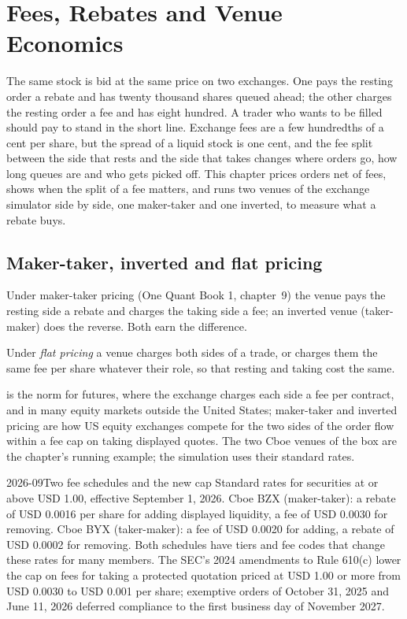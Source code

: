 \chapter{Fees, Rebates and Venue Economics}\label{ch:mx:fees-rebates-and-venue-economics}

The same stock is bid at the same price on two exchanges. One pays the resting order a rebate and has twenty thousand shares queued ahead; the other
charges the resting order a fee and has eight hundred. A trader who wants to be filled should pay to stand in the short line. Exchange fees are a few
hundredths of a cent per share, but the spread of a liquid stock is one cent, and the fee split between the side that rests and the side that takes
changes where orders go, how long queues are and who gets picked off. This chapter prices orders net of fees, shows when the split of a fee matters,
and runs two venues of the exchange simulator side by side, one maker-taker and one inverted, to measure what a rebate buys.

\section{Maker-taker, inverted and flat pricing}

Under maker-taker pricing (One Quant Book 1, chapter~9) the venue pays the resting side a rebate and charges the taking side a fee; an inverted venue
(taker-maker) does the reverse. Both earn the difference.

\begin{definition}\label{def:mx:fees-rebates-and-venue-economics:flat}
Under \emph{flat pricing} a venue charges both sides of a trade, or charges them the same fee per share whatever their role,
so that resting and taking cost the same.
\end{definition}

 is the norm for futures, where the exchange charges each side a fee per contract, and in many equity markets outside the United
States; maker-taker and inverted pricing are how US equity exchanges compete for the two sides of the order flow within a fee cap on taking displayed
quotes. The two Cboe venues of the box are the chapter's running example; the simulation uses their standard rates.

\begin{dated}{2026-09}{Two fee schedules and the new cap}\label{dat:mx:fees-rebates-and-venue-economics:cboe}
Standard rates for securities at or above USD 1.00, effective September 1, 2026. Cboe BZX (maker-taker): a rebate of USD 0.0016 per share for adding
displayed liquidity, a fee of USD 0.0030 for removing. Cboe BYX (taker-maker): a fee of USD 0.0020 for adding, a rebate of USD 0.0002 for removing.
Both schedules have tiers and fee codes that change these rates for many members. The SEC's 2024 amendments to Rule 610(c) lower the cap on fees for
taking a protected quotation priced at USD 1.00 or more from USD 0.0030 to USD 0.001 per share; exemptive orders of October 31, 2025 and June 11, 2026 deferred compliance to
the first business day of November 2027.
\end{dated}


